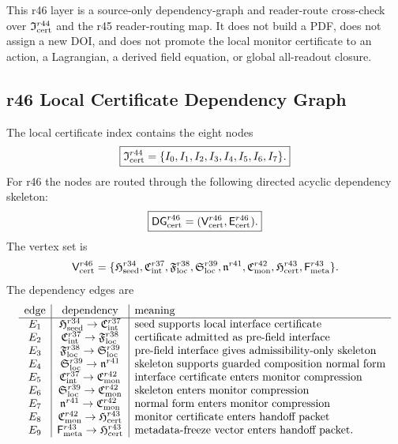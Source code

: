 This r46 layer is a source-only dependency-graph and reader-route cross-check over
\(\mathfrak I_{\rm cert}^{r44}\) and the r45 reader-routing map.  It does not
build a PDF, does not assign a new DOI, and does not promote the local monitor
certificate to an action, a Lagrangian, a derived field equation, or global
all-readout closure.

\subsection{r46 Local Certificate Dependency Graph}
\label{subsec:r46-local-certificate-dependency-graph}

The local certificate index contains the eight nodes
\[
\boxed{
\mathfrak I_{\rm cert}^{r44}
=
\{I_0,I_1,I_2,I_3,I_4,I_5,I_6,I_7\}.
}
\]
For r46 the nodes are routed through the following directed acyclic dependency
skeleton:
\[
\boxed{
\mathsf{DG}_{\rm cert}^{r46}
=
(\mathsf V_{\rm cert}^{r46},\mathsf E_{\rm cert}^{r46}).
}
\]
The vertex set is
\[
\mathsf V_{\rm cert}^{r46}
=
\{
\mathfrak H_{\rm seed}^{r34},
\mathfrak C_{\rm int}^{r37},
\mathfrak F_{\rm loc}^{r38},
\mathfrak S_{\rm loc}^{r39},
\mathfrak n^{r41},
\mathfrak C_{\rm mon}^{r42},
\mathfrak H_{\rm cert}^{r43},
\mathsf F_{\rm meta}^{r43}
\}.
\]
The dependency edges are
\[
\begin{array}{c|c|l}
\text{edge} & \text{dependency} & \text{meaning}\\
\hline
E_1  & \mathfrak H_{\rm seed}^{r34}\to\mathfrak C_{\rm int}^{r37}  & \text{seed supports local interface certificate}\\
E_2  & \mathfrak C_{\rm int}^{r37}\to\mathfrak F_{\rm loc}^{r38}  & \text{certificate admitted as pre-field interface}\\
E_3  & \mathfrak F_{\rm loc}^{r38}\to\mathfrak S_{\rm loc}^{r39}  & \text{pre-field interface gives admissibility-only skeleton}\\
E_4  & \mathfrak S_{\rm loc}^{r39}\to\mathfrak n^{r41}  & \text{skeleton supports guarded composition normal form}\\
E_5  & \mathfrak C_{\rm int}^{r37}\to\mathfrak C_{\rm mon}^{r42}  & \text{interface certificate enters monitor compression}\\
E_6  & \mathfrak S_{\rm loc}^{r39}\to\mathfrak C_{\rm mon}^{r42}  & \text{skeleton enters monitor compression}\\
E_7  & \mathfrak n^{r41}\to\mathfrak C_{\rm mon}^{r42}  & \text{normal form enters monitor compression}\\
E_8  & \mathfrak C_{\rm mon}^{r42}\to\mathfrak H_{\rm cert}^{r43}  & \text{monitor certificate enters handoff packet}\\
E_9  & \mathsf F_{\rm meta}^{r43}\to\mathfrak H_{\rm cert}^{r43}  & \text{metadata-freeze vector enters handoff packet}.
\end{array}
\]
